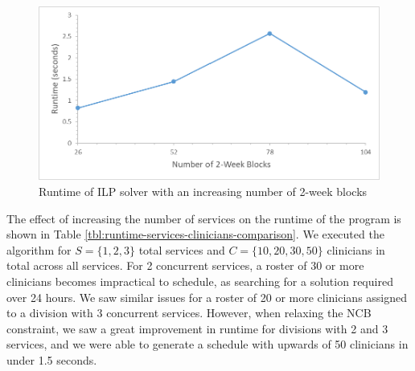 \begin{figure}[h]
	\centering
	\includegraphics[scale=.5]{fig/runtime_blocks}
	\caption{Runtime of ILP solver with an increasing number of 2-week blocks}
	\label{fig:runtime-blocks}
\end{figure}

The effect of increasing the number of services %
on the runtime of the program is shown in Table \ref{tbl:runtime-services-clinicians-comparison}. We executed the algorithm for $S = \{1, 2, 3\}$ total services and $C = \{10, 20, 30, 50\}$ clinicians in total across all services. For 2 concurrent services, a roster of 30 or more clinicians becomes impractical to schedule, as searching for a solution required over 24 hours. We saw similar issues for a roster of 20 or more clinicians assigned to a division with 3 concurrent services. However, when relaxing the NCB constraint, we saw a great improvement in runtime for divisions with 2 and 3 services, and we were able to generate a schedule with upwards of 50 clinicians in under 1.5 seconds. \\  %

